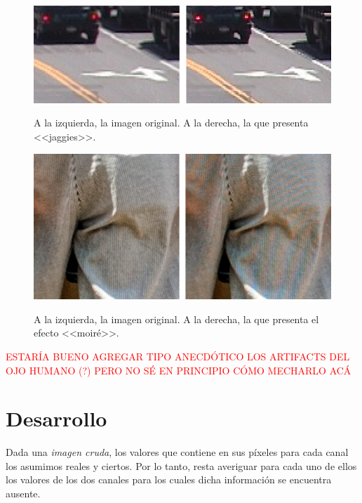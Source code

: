\documentclass[a4paper]{article}
\begin{document}
\begin{figure}[h!]
	\caption{A la izquierda, la imagen original. A la derecha, la que presenta <<jaggies>>.}
	\begin{center}
	\includegraphics[scale=0.50]{imagenes/jaggies}
	\label{jaggies}
  \end{center}
\end{figure}

\newpage

\begin{figure}[h!]
	\caption{A la izquierda, la imagen original. A la derecha, la que presenta el efecto <<moiré>>.}
	\begin{center}
	\includegraphics[scale=0.50]{imagenes/moire}
	\label{moire}
  \end{center}
\end{figure}







\textcolor{red}{ESTARÍA BUENO AGREGAR TIPO ANECDÓTICO LOS ARTIFACTS DEL OJO HUMANO (?) PERO NO SÉ EN PRINCIPIO CÓMO MECHARLO ACÁ}





\newpage
\section{Desarrollo}

Dada una \textit{imagen cruda}, los valores que contiene en sus píxeles para cada canal los asumimos reales y ciertos. Por lo tanto, resta averiguar para cada uno de ellos los valores de los dos canales para los cuales dicha información se encuentra ausente.
\end{document}
